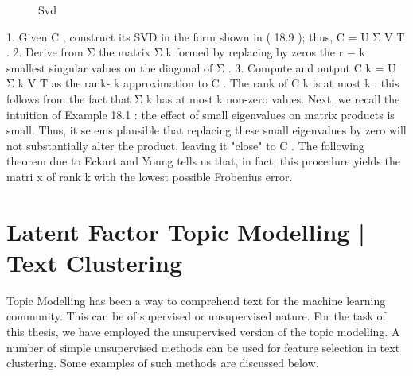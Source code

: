 \begin{figure}[H]
    {\par}
    \caption{Svd}
\end{figure}


1. Given C , construct its SVD in the form shown in ( 18.9 ); thus, C = U Σ V T . 
2. Derive from Σ the matrix Σ k formed by replacing by zeros the r − k smallest singular values on the diagonal of Σ .
3. Compute and output C k = U Σ k V T as the rank- k approximation to C . The rank of C k is at most k :  this follows from the fact that Σ k has at most k non-zero values.  Next, we recall the intuition of Example 18.1 :  the effect of small eigenvalues on matrix products is small.  Thus, it se ems plausible that replacing these small eigenvalues by zero will not substantially alter the product, leaving it "close" to C .  The following theorem due to Eckart and Young tells us that, in fact, this procedure yields the matri x of rank k with the lowest possible Frobenius error.

\section{Latent Factor Topic Modelling | Text Clustering}

Topic Modelling has been a way to comprehend text for the machine learning community. This can be of supervised or unsupervised nature. For the task of this thesis, we have employed the unsupervised version of the topic modelling. A number of simple unsupervised methods can be used for feature selection in text clustering. Some examples of such methods are discussed below.

